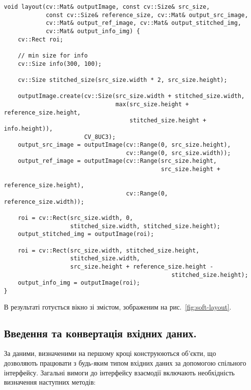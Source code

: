 \lstset{language=C++}
\begin{lstlisting}
void layout(cv::Mat& outputImage, const cv::Size& src_size,
            const cv::Size& reference_size, cv::Mat& output_src_image,
            cv::Mat& output_ref_image, cv::Mat& output_stitched_img,
            cv::Mat& output_info_img) {
    cv::Rect roi;
    
    // min size for info
    cv::Size info(300, 100);
    
    cv::Size stitched_size(src_size.width * 2, src_size.height);
    
    outputImage.create(cv::Size(src_size.width + stitched_size.width,
                                max(src_size.height + reference_size.height,
                                    stitched_size.height + info.height)),
                       CV_8UC3);
    output_src_image = outputImage(cv::Range(0, src_size.height),
                                   cv::Range(0, src_size.width));
    output_ref_image = outputImage(cv::Range(src_size.height,
                                             src_size.height + 
                                                reference_size.height),
                                   cv::Range(0, reference_size.width));
    
    roi = cv::Rect(src_size.width, 0, 
                   stitched_size.width, stitched_size.height);
    output_stitched_img = outputImage(roi);
    
    roi = cv::Rect(src_size.width, stitched_size.height,
                   stitched_size.width,
                   src_size.height + reference_size.height -
                                                stitched_size.height);
    output_info_img = outputImage(roi);    
}

\end{lstlisting}

В результаті готується вікно зі змістом, зображеним на рис.~\ref{fig:soft-layout}.



\subsection{Введення та конвертація вхідних даних.}
За даними, визначеними на першому кроці конструюються об'єкти, що дозволяють працювати з будь-яким типом вхідних даних за допомогою спільного інтерфейсу. Загальні вимоги до інтерфейсу взаємодії включають необхідність визначення наступних методів:

